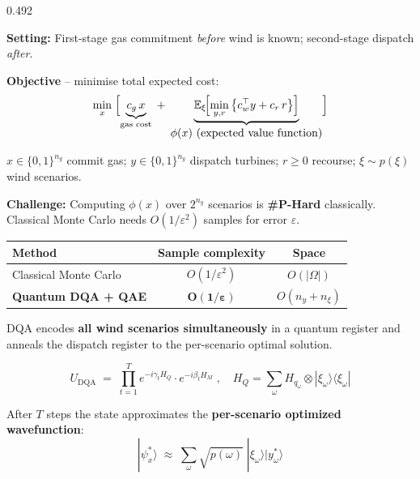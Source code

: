 \documentclass[final]{beamer}
\newcommand{\theoryblock}[2]{%
  \begin{tcolorbox}[
      enhanced, arc=6pt, boxrule=2pt,
      colback=lightblue, colframe=accentblue,
      colbacktitle=accentblue, coltitle=white,
      fonttitle=\bfseries\large, title={#1},
      top=6pt, bottom=6pt, left=9pt, right=9pt,
      before skip=5pt, after skip=0pt,
  ]#2\end{tcolorbox}}
\begin{document}
\begin{frame}[t]{}
\begin{columns}[T,totalwidth=\linewidth]
\begin{column}{0.492\linewidth}
{\textbf{Setting:} First-stage gas commitment \emph{before} wind is known;
second-stage dispatch \emph{after}.

\vspace{0.3cm}
\textbf{Objective} -- minimise total expected cost:
\[
  \min_{x}\;\Bigl[\underbrace{c_g\,x}_{\text{gas cost}}
  \;+\;
  \underbrace{\mathbb{E}_{\xi}\!\Bigl[\min_{y,r}\,\bigl\{c_w^\top y + c_r\,r\bigr\}\Bigr]}_{\displaystyle\phi(x)\ \text{(expected value function)}}\Bigr]
\]

$x\!\in\!\{0,1\}^{n_g}$ commit gas; $y\!\in\!\{0,1\}^{n_y}$ dispatch turbines;
$r\!\ge\!0$ recourse; $\xi\sim p(\xi)$ wind scenarios.

\vspace{0.3cm}
\textbf{Challenge:} Computing $\phi(x)$ over $2^{n_y}$ scenarios is
\textbf{\#P-Hard} classically. Classical Monte Carlo needs $O(1/\varepsilon^2)$
samples for error $\varepsilon$.

\vspace{0.3cm}
\begin{center}
\begin{tabular}{lcc}
  \toprule
  \textbf{Method} & \textbf{Sample complexity} & \textbf{Space} \\
  \midrule
  Classical Monte Carlo & $O(1/\varepsilon^2)$ & $O(|\Omega|)$ \\
  \textbf{Quantum DQA + QAE} & $\boldsymbol{O(1/\varepsilon)}$ & $O(n_y + n_\xi)$ \\
  \bottomrule
\end{tabular}
\end{center}
}

\vspace{0.15cm}

\theoryblock{2 \quad Digitized Quantum Annealing (DQA)}{

DQA encodes \textbf{all wind scenarios simultaneously} in a quantum register and
anneals the dispatch register to the per-scenario optimal solution.

\[
  U_\text{DQA} \;=\; \prod_{t=1}^{T}
    e^{-i\gamma_t H_Q}
    \cdot
    e^{-i\beta_t H_M}
    \;,\quad
  H_Q = \sum_\omega H_{q_\omega} \otimes |\xi_\omega\rangle\langle\xi_\omega|
\]

After $T$ steps the state approximates the \textbf{per-scenario optimized wavefunction}:
\[
  |\psi_x^*\rangle \;\approx\;
  \sum_\omega \sqrt{p(\omega)}\;|\xi_\omega\rangle|y_\omega^*\rangle
\]

}
\end{column}
\end{columns}
\end{frame}
\end{document}
